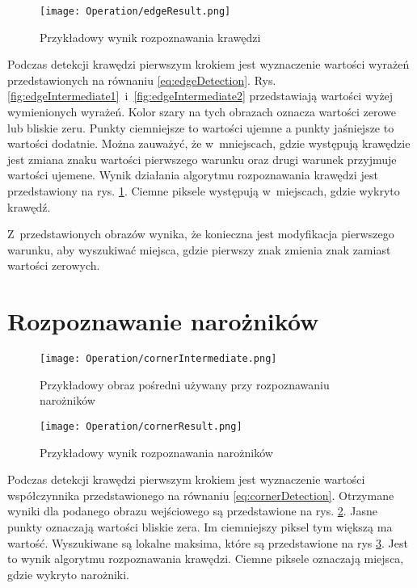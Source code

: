 \begin{figure}[h]
\begin{center}
\texttt{[image: Operation/edgeResult.png]}
\end{center}
\caption{Przykładowy wynik rozpoznawania krawędzi}
\label{fig:edgeResult}
\end{figure}

Podczas detekcji krawędzi pierwszym krokiem jest wyznaczenie wartości wyrażeń przedstawionych na równaniu \eqref{eq:edgeDetection}. Rys. \ref{fig:edgeIntermediate1}~i~\ref{fig:edgeIntermediate2} przedstawiają wartości wyżej wymienionych wyrażeń. Kolor szary na tych obrazach oznacza wartości zerowe lub bliskie zeru. Punkty ciemniejsze to wartości ujemne a punkty jaśniejsze to wartości dodatnie. Można zauważyć, że w~mniejscach, gdzie występują krawędzie jest zmiana znaku wartości pierwszego warunku oraz drugi warunek przyjmuje wartości ujemene. Wynik działania algorytmu rozpoznawania krawędzi jest przedstawiony na rys. \ref{fig:edgeResult}. Ciemne piksele występują w~miejscach, gdzie wykryto krawędź.

Z~przedstawionych obrazów wynika, że konieczna jest modyfikacja pierwszego warunku, aby wyszukiwać miejsca, gdzie pierwszy znak zmienia znak zamiast wartości zerowych.

\section{Rozpoznawanie narożników}
\label{sec:dzialanieCorner}

\begin{figure}[h]
\begin{center}
\texttt{[image: Operation/cornerIntermediate.png]}
\end{center}
\caption{Przykładowy obraz pośredni używany przy rozpoznawaniu narożników}
\label{fig:cornerIntermediate}
\end{figure}

\begin{figure}[h]
\begin{center}
\texttt{[image: Operation/cornerResult.png]}
\end{center}
\caption{Przykładowy wynik rozpoznawania narożników}
\label{fig:cornerResult}
\end{figure}

Podczas detekcji krawędzi pierwszym krokiem jest wyznaczenie wartości współczynnika przedstawionego na równaniu \eqref{eq:cornerDetection}. Otrzymane wyniki dla podanego obrazu wejściowego są przedstawione na rys. \ref{fig:cornerIntermediate}. Jasne punkty oznaczają wartości bliskie zera. Im ciemniejszy piksel tym większą ma wartość. Wyszukiwane są lokalne maksima, które są przedstawione na rys \ref{fig:cornerResult}. Jest to wynik algorytmu rozpoznawania krawędzi. Ciemne piksele oznaczają miejsca, gdzie wykryto narożniki.

